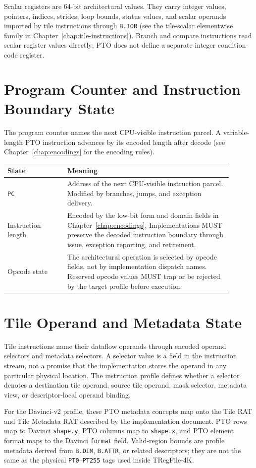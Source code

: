 Scalar registers are 64-bit architectural values. They carry integer values, pointers, indices, strides, loop bounds, status values, and scalar operands imported by tile instructions through \texttt{B.IOR} (see the tile-scalar elementwise family in Chapter~\ref{chap:tile-instructions}). Branch and compare instructions read scalar register values directly; PTO does not define a separate integer condition-code register.

\section{Program Counter and Instruction Boundary State}
The program counter names the next CPU-visible instruction parcel. A variable-length PTO instruction advances by its encoded length after decode (see Chapter~\ref{chap:encodings} for the encoding rules).

\begin{longtable}{@{}L{0.24\linewidth}L{0.66\linewidth}@{}}
\toprule
State & Meaning \\
\midrule
\texttt{PC} & Address of the next CPU-visible instruction parcel. Modified by branches, jumps, and exception delivery. \\
Instruction length & Encoded by the low-bit form and domain fields in Chapter~\ref{chap:encodings}. Implementations MUST preserve the decoded instruction boundary through issue, exception reporting, and retirement. \\
Opcode state & The architectural operation is selected by opcode fields, not by implementation dispatch names. Reserved opcode values MUST trap or be rejected by the target profile before execution. \\
\bottomrule
\end{longtable}

\section{Tile Operand and Metadata State}
Tile instructions name their dataflow operands through encoded operand selectors and metadata selectors. A selector value is a field in the instruction stream, not a promise that the implementation stores the operand in any particular physical location. The instruction profile defines whether a selector denotes a destination tile operand, source tile operand, mask selector, metadata view, or descriptor-local operand binding.

For the Davinci-v2 profile, these PTO metadata concepts map onto the Tile RAT and Tile Metadata RAT described by the implementation document. PTO rows map to Davinci \texttt{shape.y}, PTO columns map to \texttt{shape.x}, and PTO element format maps to the Davinci \texttt{format} field. Valid-region bounds are profile metadata derived from \texttt{B.DIM}, \texttt{B.ATTR}, or related descriptors; they are not the same as the physical \texttt{PT0}--\texttt{PT255} tags used inside TRegFile-4K.

